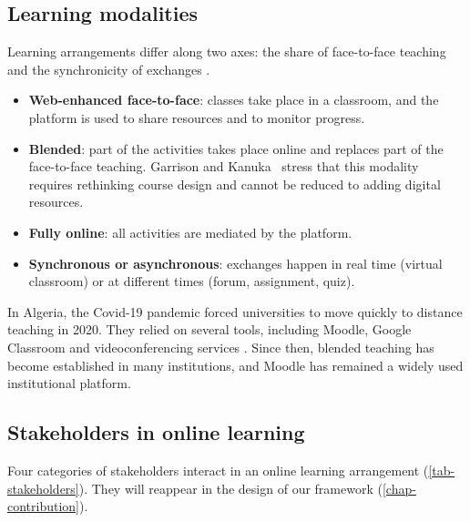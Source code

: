 \subsection{Learning modalities}

Learning arrangements differ along two axes: the share of face-to-face
teaching and the synchronicity of exchanges \cite{moore2012}.

\begin{itemize}
  \item \textbf{Web-enhanced face-to-face}: classes take place in a
        classroom, and the platform is used to share resources and to
        monitor progress.
  \item \textbf{Blended}: part of the activities takes place online and
        replaces part of the face-to-face teaching. Garrison and
        Kanuka~\cite{garrison2004} stress that this modality requires
        rethinking course design and cannot be reduced to adding digital
        resources.
  \item \textbf{Fully online}: all activities are mediated by the platform.
  \item \textbf{Synchronous or asynchronous}: exchanges happen in real
        time (virtual classroom) or at different times (forum, assignment,
        quiz).
\end{itemize}

In Algeria, the Covid-19 pandemic forced universities to move quickly to
distance teaching in 2020. They relied on several tools, including Moodle,
Google Classroom and videoconferencing services \cite{kerrouzi2023}. Since
then, blended teaching has become established in many institutions, and
Moodle has remained a widely used institutional platform.

\subsection{Stakeholders in online learning}
\label{subsec-stakeholders}

Four categories of stakeholders interact in an online learning
arrangement (\cref{tab-stakeholders}). They will reappear in the design of
our framework (\cref{chap-contribution}).

